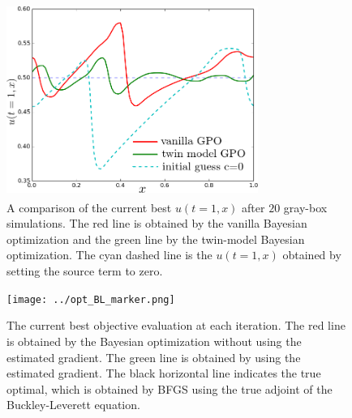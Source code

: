 \begin{figure}[htbp]\begin{center}
    \includegraphics[width=8.2cm,height=6.3cm]{../finalutx.png}
    \caption{A comparison of the current best $u(t=1,x)$ after $20$ gray-box simulations.
             The red line is obtained by the vanilla Bayesian optimization and the green line by the
             twin-model Bayesian optimization. The cyan dashed line is the $u(t=1,x)$ 
             obtained by setting the source term to zero.
             }
    \label{fig: u t=1 BL}
\end{center}\end{figure}

\begin{figure}[htbp]\begin{center}
    \texttt{[image: ../opt\_BL\_marker.png]}
    \caption{The current best objective evaluation 
             at each iteration. The red line is obtained by the 
             Bayesian optimization without using the estimated gradient. 
             The green line is obtained by using the estimated gradient. 
             The black horizontal line indicates the true optimal, which is obtained
             by BFGS using the true adjoint of the Buckley-Leverett equation.}
    \label{fig: current best BL}
\end{center}\end{figure}

